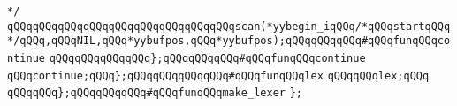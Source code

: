 \verb|*/|\newline
\verb|qQQqqQQqqQQqqQQqqQQqqQQqqQQqqQQqqQQqscan(*yybegin_iqQQq/*qQQqstartqQQq*/qQQq,qQQqNIL,qQQq*yybufpos,qQQq*yybufpos);qQQqqQQqqQQq#qQQqfunqQQqcontinue|\newline
\verb|qQQqqQQqqQQqqQQq};qQQqqQQqqQQq#qQQqfunqQQqcontinue|\newline
\verb|qQQqcontinue;qQQq};qQQqqQQqqQQqqQQq#qQQqfunqQQqlex|\newline
\verb|qQQqqQQqlex;qQQq|\newline
\verb|qQQqqQQq};qQQqqQQqqQQq#qQQqfunqQQqmake_lexer|\newline
\verb|};|\newline

